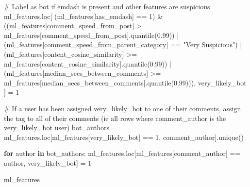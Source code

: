 \documentclass[
  12pt,
  letterpaper,
  DIV=11,
  numbers=noendperiod]{scrartcl}
\newenvironment{Shaded}{\begin{snugshade}}{\end{snugshade}}
\newcommand{\CommentTok}[1]{\textcolor[rgb]{0.37,0.37,0.37}{#1}}
\newcommand{\ControlFlowTok}[1]{\textcolor[rgb]{0.00,0.23,0.31}{\textbf{#1}}}
\newcommand{\DecValTok}[1]{\textcolor[rgb]{0.68,0.00,0.00}{#1}}
\newcommand{\FloatTok}[1]{\textcolor[rgb]{0.68,0.00,0.00}{#1}}
\newcommand{\KeywordTok}[1]{\textcolor[rgb]{0.00,0.23,0.31}{\textbf{#1}}}
\newcommand{\NormalTok}[1]{\textcolor[rgb]{0.00,0.23,0.31}{#1}}
\newcommand{\OperatorTok}[1]{\textcolor[rgb]{0.37,0.37,0.37}{#1}}
\newcommand{\StringTok}[1]{\textcolor[rgb]{0.13,0.47,0.30}{#1}}
\begin{document}
\begin{Shaded}
\begin{Highlighting}[]
\CommentTok{\# Label as bot if emdash is present and other features are suspicious}
\NormalTok{ml\_features.loc[}
\NormalTok{    (ml\_features[}\StringTok{\textquotesingle{}has\_emdash\textquotesingle{}}\NormalTok{] }\OperatorTok{==} \DecValTok{1}\NormalTok{) }\OperatorTok{\&}
\NormalTok{    ((ml\_features[}\StringTok{\textquotesingle{}comment\_speed\_from\_post\textquotesingle{}}\NormalTok{] }\OperatorTok{\textgreater{}=}\NormalTok{ ml\_features[}\StringTok{\textquotesingle{}comment\_speed\_from\_post\textquotesingle{}}\NormalTok{].quantile(}\FloatTok{0.99}\NormalTok{)) }\OperatorTok{|}
\NormalTok{     (ml\_features[}\StringTok{\textquotesingle{}comment\_speed\_from\_parent\_category\textquotesingle{}}\NormalTok{] }\OperatorTok{==} \StringTok{"Very Suspicious"}\NormalTok{) }\OperatorTok{|}
\NormalTok{     (ml\_features[}\StringTok{\textquotesingle{}content\_cosine\_similarity\textquotesingle{}}\NormalTok{] }\OperatorTok{\textgreater{}=}\NormalTok{ ml\_features[}\StringTok{\textquotesingle{}content\_cosine\_similarity\textquotesingle{}}\NormalTok{].quantile(}\FloatTok{0.99}\NormalTok{)) }\OperatorTok{|}
\NormalTok{     (ml\_features[}\StringTok{\textquotesingle{}median\_secs\_between\_comments\textquotesingle{}}\NormalTok{] }\OperatorTok{\textgreater{}=}\NormalTok{ ml\_features[}\StringTok{\textquotesingle{}median\_secs\_between\_comments\textquotesingle{}}\NormalTok{].quantile(}\FloatTok{0.99}\NormalTok{))),}
    \StringTok{\textquotesingle{}very\_likely\_bot\textquotesingle{}}
\NormalTok{] }\OperatorTok{=} \DecValTok{1}

\CommentTok{\# If a user has been assigned very\_likely\_bot to one of their comments, assign the tag to all of their comments (ie all rows where comment\_author is the very\_likely\_bot user)}
\NormalTok{bot\_authors }\OperatorTok{=}\NormalTok{ ml\_features.loc[ml\_features[}\StringTok{\textquotesingle{}very\_likely\_bot\textquotesingle{}}\NormalTok{] }\OperatorTok{==} \DecValTok{1}\NormalTok{, }\StringTok{\textquotesingle{}comment\_author\textquotesingle{}}\NormalTok{].unique()}

\ControlFlowTok{for}\NormalTok{ author }\KeywordTok{in}\NormalTok{ bot\_authors:}
\NormalTok{    ml\_features.loc[ml\_features[}\StringTok{\textquotesingle{}comment\_author\textquotesingle{}}\NormalTok{] }\OperatorTok{==}\NormalTok{ author, }\StringTok{\textquotesingle{}very\_likely\_bot\textquotesingle{}}\NormalTok{] }\OperatorTok{=} \DecValTok{1}

\NormalTok{ml\_features}
\end{Highlighting}
\end{Shaded}
\end{document}
